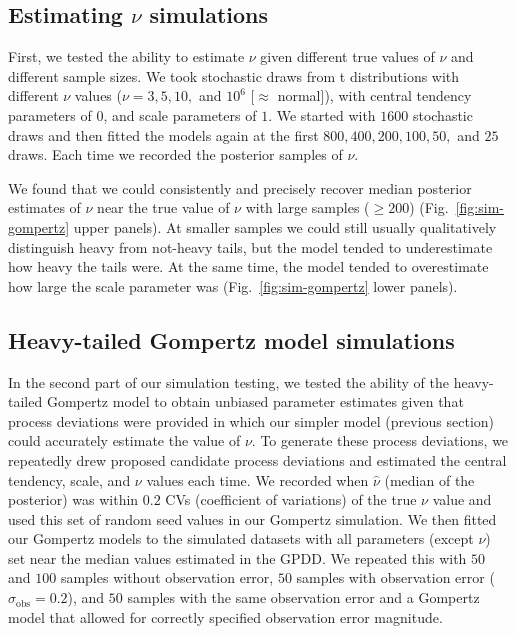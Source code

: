 \subsection{Estimating $\nu$ simulations}

First, we tested the ability to estimate $\nu$ given different true values of
$\nu$ and different sample sizes. We took stochastic draws from t distributions with
different $\nu$ values ($\nu = 3, 5, 10,$ and $10^6$ [$\approx$ normal]), with
central tendency parameters of $0$, and scale parameters of $1$. We started with
$1600$ stochastic draws and then fitted the models again at the first $800, 400,
200, 100, 50,$ and $25$ draws. Each time we recorded the posterior samples of
$\nu$.

We found that we could consistently and precisely recover median posterior
estimates of $\nu$ near the true value of $\nu$ with large samples ($\ge 200$)
(Fig.~\ref{fig:sim-gompertz} upper panels). At smaller samples we could still
usually qualitatively distinguish heavy from not-heavy tails, but the
model tended to underestimate how heavy the tails were. At the same time, the
model tended to overestimate how large the scale parameter was
(Fig.~\ref{fig:sim-gompertz} lower panels).

\subsection{Heavy-tailed Gompertz model simulations}

In the second part of our simulation testing, we tested the ability of the
heavy-tailed Gompertz model to obtain unbiased parameter estimates given that
process deviations were provided in which our simpler model (previous
section) could accurately estimate the value of $\nu$. To generate these process
deviations, we repeatedly drew proposed candidate process deviations and estimated the
central tendency, scale, and $\nu$ values each time. We recorded when
$\hat{\nu}$ (median of the posterior) was within $0.2$ CVs (coefficient of
variations) of the true $\nu$
value and used this set of random seed values in our Gompertz simulation. We
then fitted our Gompertz models to the simulated datasets with all parameters
(except $\nu$) set near the median values estimated in the GPDD. We repeated
this with $50$ and $100$ samples without observation error, $50$ samples with
observation error ($\sigma_\mathrm{obs} = 0.2$), and $50$ samples with the same
observation error and a Gompertz model that allowed for correctly specified
observation error magnitude.

